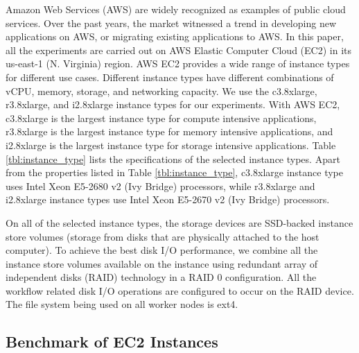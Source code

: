 Amazon Web Services (AWS) are widely recognized as examples of public cloud services. Over the past years, the market witnessed a trend in developing new applications on AWS, or migrating existing applications to AWS. In this paper, all the experiments are carried out on AWS Elastic Computer Cloud (EC2) in its us-east-1 (N. Virginia) region. AWS EC2 provides a wide range of instance types for different use cases. Different instance types have different combinations of vCPU, memory, storage, and networking capacity. We use the c3.8xlarge, r3.8xlarge, and i2.8xlarge instance types for our experiments. With AWS EC2, c3.8xlarge is the largest instance type for compute intensive applications, r3.8xlarge is the largest instance type for memory intensive applications, and i2.8xlarge is the largest instance type for storage intensive applications. Table \ref{tbl:instance_type} lists the specifications of the selected instance types. Apart from the properties listed in Table \ref{tbl:instance_type}, c3.8xlarge instance type uses Intel Xeon E5-2680 v2 (Ivy Bridge) processors, while r3.8xlarge and i2.8xlarge instance types use Intel Xeon E5-2670 v2 (Ivy Bridge) processors.  

On all of the selected instance types, the storage devices are SSD-backed instance store volumes (storage from disks that are physically attached to the host computer). To achieve the best disk I/O performance, we combine all the instance store volumes available on the instance using redundant array of independent disks (RAID) technology in a RAID 0 configuration. All the workflow related disk I/O operations are configured to occur on the RAID device. The file system being used on all worker nodes is ext4.

\subsection{Benchmark of EC2 Instances}
\label{sec:subsec:ec2_benchmark}

